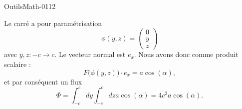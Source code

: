 
\begin{corrige}{OutilsMath-0112}

    Le carré a pour paramétrisation
    \begin{equation}
        \phi(y,z)=\begin{pmatrix}
            0    \\ 
            y    \\ 
            z    
        \end{pmatrix}
    \end{equation}
    avec $y,z\colon -c\to c$. Le vecteur normal est $e_x$. Nous avons donc comme produit scalaire :
    \begin{equation}
        F\big( \phi(y,z) \big)\cdot e_x=a\cos(\alpha),
    \end{equation}
    et par conséquent un flux
    \begin{equation}
        \Phi=\int_{-c}^cdy\int_{-c}^c dza\cos(\alpha)=4c^2a\cos(\alpha).
    \end{equation}

\end{corrige}
